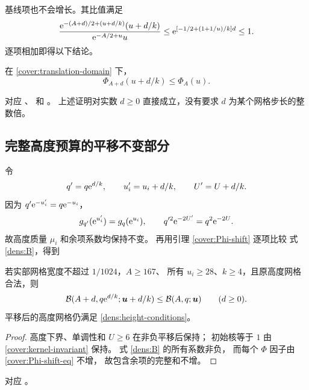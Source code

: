 基线项也不会增长。其比值满足
\[
 \frac{\mathrm e^{-(A+d)/2+(u+d/k)}(u+d/k)}
      {\mathrm e^{-A/2+u}u}
 \leq
 \mathrm e^{[-1/2+(1+1/u)/k]d}\leq1.
\]
逐项相加即得以下结论。

\begin{lemma}[密度预算的联合平移]\label{cover:Phi-shift}
在 \eqref{cover:translation-domain} 下，
\begin{equation}\label{cover:Phi-shift-eq}
 \Phi_{A+d}(u+d/k)\leq\Phi_A(u).
\end{equation}
\end{lemma}
对应
、
和 。
上述证明对实数 $d\geq0$ 直接成立，没有要求 $d$
为某个网格步长的整数倍。

\subsection{完整高度预算的平移不变部分}

令
\begin{equation}\label{cover:shift-parameters}
 q'=q\mathrm e^{d/k},\qquad u_i'=u_i+d/k,\qquad U'=U+d/k.
\end{equation}
因为 $q'\mathrm e^{-u_i'}=q\mathrm e^{-u_i}$，
\begin{equation}\label{cover:kernel-invariant}
 g_{q'}(\mathrm e^{u_i'})=g_q(\mathrm e^{u_i}),\qquad
 q'^2\mathrm e^{-2U'}=q^2\mathrm e^{-2U}.
\end{equation}
故高度质量 $\mu_i$ 和余项系数均保持不变。
再用引理 \ref{cover:Phi-shift} 逐项比较
式 \eqref{dens:B}，得到
\begin{proposition}[完整预算向上平移]\label{cover:B-shift}
若实部网格宽度不超过 $1/1024$，$A\geq167$、
所有 $u_i\geq28$、$k\geq4$，且原高度网格合法，则
\begin{equation}\label{cover:B-shift-eq}
 \mathcal B(A+d,q\mathrm e^{d/k};\boldsymbol u+d/k)
 \leq\mathcal B(A,q;\boldsymbol u)\qquad(d\geq0).
\end{equation}
平移后的高度网格仍满足
\eqref{dens:height-conditions}。
\end{proposition}
\begin{proof}
高度下界、单调性和 $U\geq6$ 在非负平移后保持；
初始核等于 $1$ 由 \eqref{cover:kernel-invariant} 保持。
式 \eqref{dens:B} 的所有系数非负，
而每个 $\Phi$ 因子由 \eqref{cover:Phi-shift-eq} 不增，
故包含余项的完整和不增。
\end{proof}
对应
。


